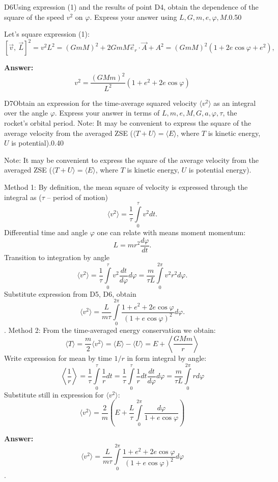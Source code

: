 \documentclass[11pt,a4paper]{article}
\begin{document}
\begin{solcard}{D6}{Using expression (1) and the results of point D4, obtain the dependence of the square of the speed $v^2$ on $\varphi$. Express your answer using $L, G, m, e, \varphi, M$.}{0.50}

Let's square expression (1): $$[\vec v, ~\vec L]^2=v^2L^2= (GmM)^2 + 2 GmM \vec{e}_r \cdot \vec{A} + A^2 = (GmM)^2 (1 + 2e \cos \varphi + e^2),$$

\par\smallskip\noindent\textbf{Answer:} $$v^2=\dfrac{(GMm)^2}{L^2}(1+e^2+2e\cos{\varphi})$$
\end{solcard}

\begin{solcard}{D7}{Obtain an expression for the time-average squared velocity $\langle v^2\rangle $ as an integral over the angle $\varphi$. Express your answer in terms of $  L,  m,  e,  M, G, a, \varphi, \tau$, the rocket’s orbital period. Note: It may be convenient to express the square of the average velocity from the averaged ZSE ($\langle T+U\rangle=\langle E\rangle$, where $T$ is kinetic energy, $U$ is potential).}{0.40}

Note: It may be convenient to express the square of the average velocity from the averaged ZSE ($\langle T+U\rangle=\langle E\rangle$, where $T$ is kinetic energy, $U$ is potential energy).


Method 1: By definition, the mean square of velocity is expressed through the integral as ($\tau$ – period of motion) $$\langle v^2\rangle= \dfrac{1}{\tau}\int\limits_{0}^{\tau}v^2 dt.$$Differential time and angle $\varphi$ one can relate with means moment momentum: $$L=mr^2\dfrac{d\varphi}{dt}.$$Transition to integration by angle $$\langle v^2 \rangle =\dfrac{1}{\tau}\int\limits_{0}^{\tau}v^2\dfrac{dt}{d\varphi}d\varphi=\dfrac{m}{\tau L}\int\limits_{0}^{2\pi}v^2r^2d\varphi.$$Substitute expression from D5, D6, obtain $$\langle v^2 \rangle= \dfrac{L}{m\tau} \int\limits_{0}^{2\pi}\dfrac{1+e^2+2e\cos{\varphi}}{(1+e\cos{\varphi})^2}d\varphi .$$. Method 2: From the time-averaged energy conservation we obtain: $$\langle T\rangle=\dfrac{m}{2}\langle v^2\rangle=\langle E\rangle-\langle U\rangle=E+\left\langle \dfrac{GMm}{r}\right\rangle$$Write expression for mean by time $1/r$ in form integral by angle: $$\left\langle \dfrac{1}{r}\right\rangle= \dfrac{1}{\tau}\int\limits_{0}^{\tau}\dfrac{1}{r} dt = \dfrac{1}{\tau}\int\limits_{0}^{\tau}\dfrac{1}{r} dt\dfrac{dt}{d\varphi}d\varphi=\dfrac{m}{\tau L}\int\limits_{0}^{2\pi}rd\varphi $$Substitute still in expression for $\langle v^2 \rangle$: $$\langle v^2 \rangle=\dfrac{2}{m}\left(E+\dfrac{L}{\tau}\int\limits_{0}^{2\pi}\dfrac{d\varphi}{1+e\cos{\varphi}}\right)$$

\par\smallskip\noindent\textbf{Answer:} $$\langle v^2 \rangle= \dfrac{L}{m\tau} \int\limits_{0}^{2\pi}\dfrac{1+e^2+2e\cos{\varphi}}{(1+e\cos{\varphi})^2}d\varphi$$.
\end{solcard}
\end{document}
